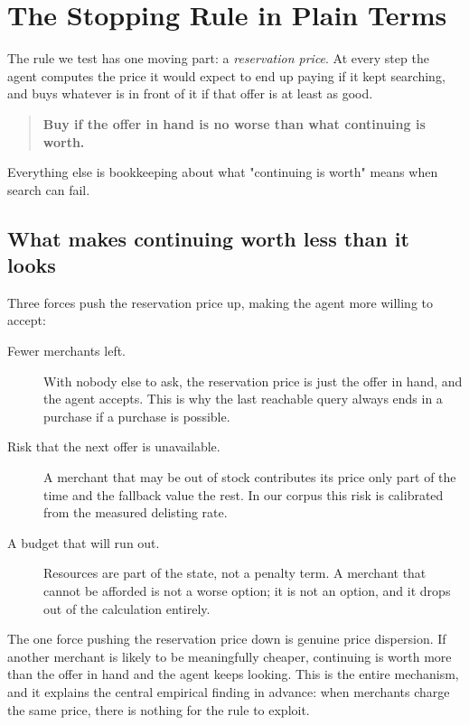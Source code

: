 \section{The Stopping Rule in Plain Terms}
\label{sec:model}

The rule we test has one moving part: a \emph{reservation price}. At every step the
agent computes the price it would expect to end up paying if it kept searching, and
buys whatever is in front of it if that offer is at least as good.

\begin{quote}
\textbf{Buy if the offer in hand is no worse than what continuing is worth.}
\end{quote}

Everything else is bookkeeping about what "continuing is worth" means when search can
fail.

\subsection{What makes continuing worth less than it looks}

Three forces push the reservation price up, making the agent more willing to accept:

\begin{description}
  \item[Fewer merchants left.] With nobody else to ask, the reservation price is just
    the offer in hand, and the agent accepts. This is why the last reachable query
    always ends in a purchase if a purchase is possible.
  \item[Risk that the next offer is unavailable.] A merchant that may be out of stock
    contributes its price only part of the time and the fallback value the rest. In
    our corpus this risk is calibrated from the measured delisting rate.
  \item[A budget that will run out.] Resources are part of the state, not a penalty
    term. A merchant that cannot be afforded is not a worse option; it is not an
    option, and it drops out of the calculation entirely.
\end{description}

The one force pushing the reservation price down is genuine price dispersion. If
another merchant is likely to be meaningfully cheaper, continuing is worth more than
the offer in hand and the agent keeps looking. This is the entire mechanism, and it
explains the central empirical finding in advance: when merchants charge the same
price, there is nothing for the rule to exploit.

